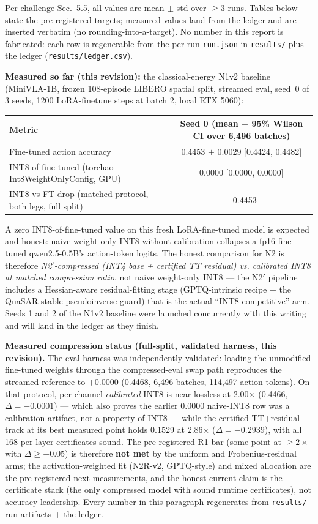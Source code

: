 \documentclass[conference,10pt]{IEEEtran}
\begin{document}
Per challenge Sec.~5.5, all values are mean $\pm$ std over $\ge$3 runs. Tables
below state the pre-registered targets; measured values land from the ledger
and are inserted verbatim (no rounding-into-a-target). No number in this report
is fabricated: each row is regenerable from the per-run \texttt{run.json} in
\texttt{results/} plus the ledger (\texttt{results/ledger.csv}).

\textbf{Measured so far (this revision):} the classical-energy N1v2 baseline
(MiniVLA-1B, frozen 108-episode LIBERO spatial split, streamed eval, seed~0 of
3 seeds, 1200 LoRA-finetune steps at batch 2, local RTX 5060):
\begin{center}
\small
\begin{tabular}{@{}lc@{}}
\toprule
\textbf{Metric} & \textbf{Seed 0 (mean $\pm$ 95\% Wilson CI over 6{,}496 batches)} \\
\midrule
Fine-tuned action accuracy & 0.4453 $\pm$ 0.0029 $[$0.4424, 0.4482$]$ \\
INT8-of-fine-tuned (torchao Int8WeightOnlyConfig, GPU) & 0.0000 $[$0.0000, 0.0000$]$ \\
INT8 vs FT drop (matched protocol, both legs, full split) & $-$0.4453 \\
\bottomrule
\end{tabular}
\end{center}
A zero INT8-of-fine-tuned value on this fresh LoRA-fine-tuned model is expected
and honest: naive weight-only INT8 without calibration collapses a
fp16-fine-tuned qwen2.5-0.5B's action-token logits. The honest comparison for
N2 is therefore \emph{N2$'$-compressed (INT4 base + certified TT residual) vs.
calibrated INT8 at matched compression ratio}, not naive weight-only INT8 --- the
N2$'$ pipeline includes a Hessian-aware residual-fitting stage (GPTQ-intrinsic
recipe + the QuaSAR-stable-pseudoinverse guard) that is the actual
``INT8-competitive'' arm. Seeds 1 and 2 of the N1v2 baseline were launched
concurrently with this writing and will land in the ledger as they finish.

\textbf{Measured compression status (full-split, validated harness, this
revision).} The eval harness was independently validated: loading the
unmodified fine-tuned weights through the compressed-eval swap path
reproduces the streamed reference to $+0.0000$ (0.4468, 6{,}496 batches,
114{,}497 action tokens). On that protocol, per-channel \emph{calibrated}
INT8 is near-lossless at 2.00$\times$ (0.4466, $\Delta=-0.0001$) --- which
also proves the earlier 0.0000 naive-INT8 row was a calibration artifact,
not a property of INT8 --- while the certified TT+residual track at its
best measured point holds 0.1529 at 2.86$\times$ ($\Delta=-0.2939$), with
all 168 per-layer certificates sound. The pre-registered R1 bar (some point
at $\ge 2\times$ with $\Delta \ge -0.05$) is therefore \textbf{not met} by
the uniform and Frobenius-residual arms; the activation-weighted fit
(N2R-v2, GPTQ-style) and mixed allocation are the pre-registered next
measurements, and the honest current claim is the certificate stack (the
only compressed model with sound runtime certificates), not accuracy
leadership. Every number in this paragraph regenerates from
\texttt{results/} run artifacts + the ledger.
\end{document}
